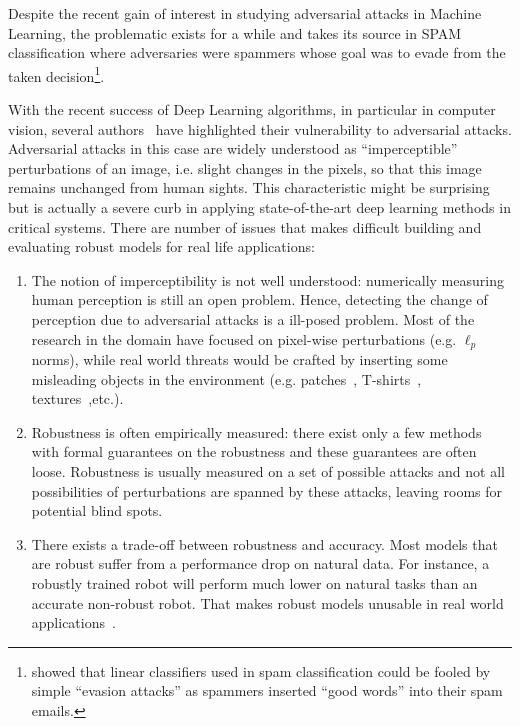 Despite the recent gain of interest in studying adversarial attacks in Machine Learning, the problematic exists for a while and takes its source in SPAM classification where adversaries were spammers whose goal was to evade from the taken decision\footnote{\cite{dalvi2004adversarial} showed that linear classifiers used in spam classification could be fooled by simple ``evasion attacks'' as spammers inserted ``good words'' into their spam emails.}.

With the recent success of Deep Learning algorithms, in particular in computer vision, several authors~\citep{biggio2013evasion,Szegedy2013IntriguingPO} have  highlighted their vulnerability to adversarial attacks. Adversarial attacks in this case are widely understood as ``imperceptible'' perturbations of an image, i.e. slight changes in the pixels, so that this image remains unchanged from human sights. This characteristic might be surprising but is actually a severe curb in applying state-of-the-art deep learning methods in critical systems. There are number of issues that makes difficult building and evaluating robust models for real life applications:
\begin{enumerate}
    \item The notion of imperceptibility is not well understood: numerically measuring human perception is still an open problem. Hence, detecting the change of perception due to adversarial attacks is a ill-posed problem. Most of the  research in the domain have focused on pixel-wise perturbations (e.g. $\ell_p$ norms), while real world threats would be crafted by inserting some misleading objects in the environment (e.g. patches~\citep{brown2017adversarial}, T-shirts~\citep{xu2020adversarial}, textures~\cite{XXX},etc.).
    \item Robustness is often empirically measured: there exist only a few methods with formal guarantees on the robustness and these guarantees are often loose. Robustness is usually measured on a set of possible attacks and not all possibilities of perturbations are spanned by these attacks, leaving rooms for potential blind spots.
    \item There exists a trade-off between robustness and accuracy. Most models that are robust suffer from a performance drop on natural data. For instance, a robustly trained robot will perform much lower on natural tasks than an accurate non-robust robot. That makes robust models unusable in real world applications~\citep{lechner2021adversarial}. 
\end{enumerate}

